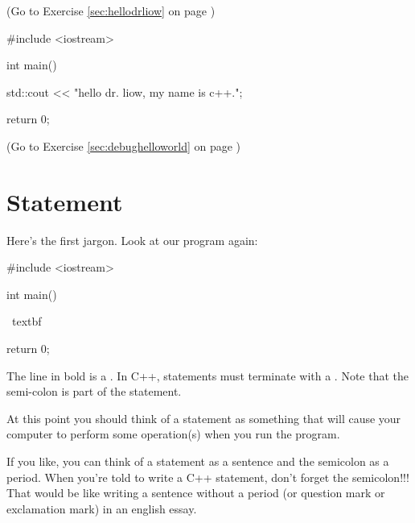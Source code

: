 \begin{soln}
\label{sec:hellodrliow_soln} 
(Go to Exercise \ref{sec:hellodrliow} 
on page \pageref{sec:hellodrliow})
\begin{console}
#include <iostream>

int main()
{
    std::cout << "hello dr. liow, my name is c++.\n";  
 
    return 0;   
}  
\end{console}   
\end{soln}  


\begin{soln} 
\label{sec:debughelloworld_soln} 
(Go to Exercise \ref{sec:debughelloworld} 
on page \pageref{sec:debughelloworld})
\end{soln}








\newpage\section{Statement}

Here's the first jargon. Look at our program again:
\begin{console}[commandchars=\~\%\@]
#include <iostream>

int main()
{
    ~textbf%

    return 0;
}
\end{console}

The line in bold is a 
. 
In C++, statements must terminate with a 
. 
Note that the semi-colon is part of the statement. 

At this point you should think of a statement as something that will cause 
your computer to perform some operation(s) when you run the program.

If you like, you can think of a statement as a sentence and the semicolon as a
period. When you're told to write a C++ statement, don't forget the 
semicolon!!! 
That would be like writing a sentence without a period (or question mark or 
exclamation mark) in an english essay.


